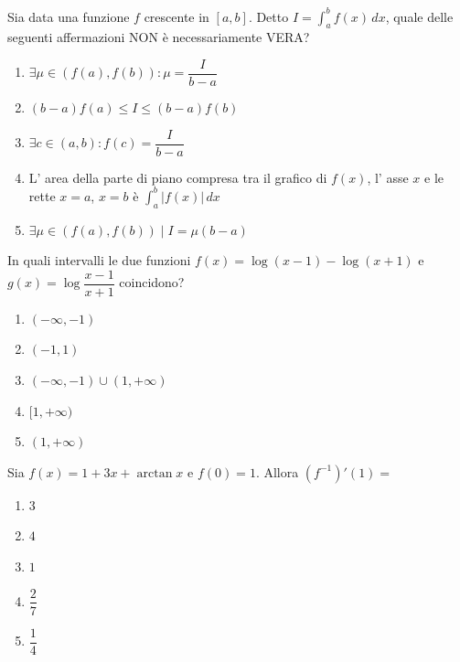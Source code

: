 \begin{quiz}
Sia data una funzione $f$ crescente in $[a,b]$. Detto $I=\int_a^b f(x)\,dx$, quale delle seguenti affermazioni NON \`e necessariamente VERA?
\begin{enumerate}
\item $\exists\mu\in(f(a),f(b)):\mu=\dfrac{I}{b-a}$
\item $(b-a)f(a)\le I\le(b-a)f(b)$
\item $\exists c\in(a,b):f(c)=\dfrac{I}{b-a}$
\item L' area della parte di piano compresa tra il grafico di $f(x)$, l' asse $x$ e le rette $x=a$, $x=b$ \`e $\displaystyle\int_a^b|f(x)|\,dx$
\item $\exists\mu\in(f(a),f(b))\mid I=\mu(b-a)$
\end{enumerate}
\end{quiz}

\begin{quiz}
In quali intervalli le due funzioni $f(x)=\log(x-1)-\log(x+1)$ e $g(x)=\log\dfrac{x-1}{x+1}$ coincidono?
\begin{enumerate}
\item $(-\infty,-1)$
\item $(-1,1)$
\item $(-\infty,-1)\cup(1,+\infty)$
\item $[1,+\infty)$
\item $(1,+\infty)$
\end{enumerate}
\end{quiz}

\begin{quiz}
Sia $f(x)=1+3x+\arctan x$ e $f(0)=1$. Allora $(f^{-1})\prime(1)=$
\begin{enumerate}
\item $3$
\item $4$
\item $1$
\item $\dfrac27$
\item $\dfrac14$
\end{enumerate}
\end{quiz}


